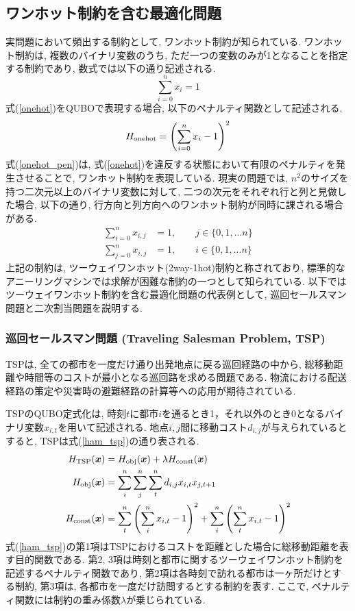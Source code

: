 \documentclass[submit,techrep,noauthor]{ipsj}
\begin{document}
\subsection{ワンホット制約を含む最適化問題}
実問題において頻出する制約として, ワンホット制約が知られている. ワンホット制約は, 複数のバイナリ変数のうち, ただ一つの変数のみが1となることを指定する制約であり, 数式では以下の通り記述される.
\begin{equation}
\sum_{i=0}^{n}x_{i} = 1 \label{onehot}
\end{equation}
式(\ref{onehot})をQUBOで表現する場合, 以下のペナルティ関数として記述される.
\begin{equation}
H_{{\rm onehot}}=\left(\sum_{i=0}^{n}x_{i} - 1\right)^{2} \label{onehot_pen}
\end{equation}
式(\ref{onehot_pen})は, 式(\ref{onehot})を違反する状態において有限のペナルティを発生させることで, ワンホット制約を表現している. 現実の問題では, $n^{2}$のサイズを持つ二次元以上のバイナリ変数に対して, 二つの次元をそれぞれ行と列と見做した場合, 以下の通り, 行方向と列方向へのワンホット制約が同時に課される場合がある.
\begin{align}
\sum_{i=0}^{n}x_{i, j} &= 1,\hspace{2em}j\in\{0,1,...n\}\\
\sum_{j=0}^{n}x_{i, j} &= 1,\hspace{2em}i\in\{0,1,...n\}
\end{align}
上記の制約は, ツーウェイワンホット(2way-1hot)制約と称されており\cite{yatabe}, 標準的なアニーリングマシンでは求解が困難な制約の一つとして知られている\cite{da3}. 以下ではツーウェイワンホット制約を含む最適化問題の代表例として, 巡回セールスマン問題と二次割当問題を説明する.

\subsubsection{巡回セールスマン問題 (Traveling Salesman Problem, TSP)}
TSPは, 全ての都市を一度だけ通り出発地点に戻る巡回経路の中から, 総移動距離や時間等のコストが最小となる巡回路を求める問題である. 物流における配送経路の策定や災害時の避難経路の計算等への応用が期待されている. 

TSPのQUBO定式化は, 時刻$t$に都市$i$を通るとき1，それ以外のとき0となるバイナリ変数$x_{i,t}$を用いて記述される. 
地点$i, j$間に移動コスト$d_{i, j}$が与えられているとすると, TSPは式(\ref{ham_tsp})の通り表される.
\begin{align}
H_{\rm{TSP}}(\bm{x}) &= H_{\rm{obj}}(\bm{x}) + \lambda H_{\rm{const}}(\bm{x})\nonumber\\
H_{\rm{obj}}(\bm{x}) &= \sum_{i}^{n}\sum_{j}^{n}\sum_{t}^{n}d_{i,j}x_{i,t}x_{j,t+1}\nonumber\\
H_{\rm{const}}(\bm{x}) &= \sum_{t}^{n}\left(\sum_{i}^{n}x_{i,t}-1\right)^{2} + \sum_{i}^{n}\left(\sum_{t}^{n}x_{i,t}-1\right)^{2} \label{ham_tsp}
\end{align}
式(\ref{ham_tsp})の第1項はTSPにおけるコストを距離とした場合に総移動距離を表す目的関数である. 第2, 3項は時刻と都市に関するツーウェイワンホット制約を記述するペナルティ関数であり, 第2項は各時刻で訪れる都市は一ヶ所だけとする制約, 第3項は, 各都市を一度だけ訪問するとする制約を表す. ここで, ペナルティ関数には制約の重み係数$\lambda$が乗じられている. 
\end{document}
